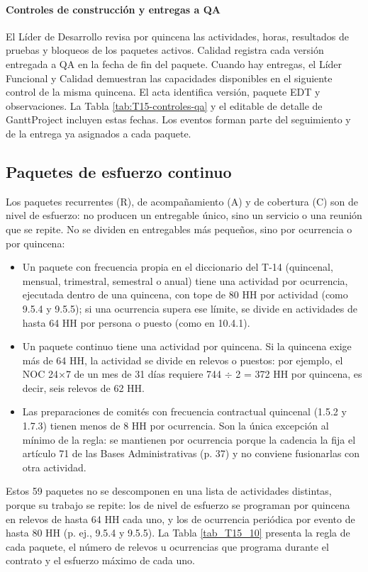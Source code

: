 \paragraph{Controles de construcción y entregas a QA}
El Líder de Desarrollo revisa por quincena las actividades, horas, resultados de pruebas y bloqueos de los paquetes activos. Calidad registra cada versión entregada a QA en la fecha de fin del paquete. Cuando hay entregas, el Líder Funcional y Calidad demuestran las capacidades disponibles en el siguiente control de la misma quincena. El acta identifica versión, paquete EDT y observaciones. La Tabla \ref{tab:T15-controles-qa} y el editable de detalle de GanttProject incluyen estas fechas. Los eventos forman parte del seguimiento y de la entrega ya asignados a cada paquete.


\subsection{Paquetes de esfuerzo continuo}

Los paquetes recurrentes (R), de acompañamiento (A) y de cobertura (C) son de nivel de esfuerzo: no producen un entregable único, sino un servicio o una reunión que se repite. No se dividen en entregables más pequeños, sino por ocurrencia o por quincena:

\begin{itemize}
\item Un paquete con frecuencia propia en el diccionario del T-14 (quincenal, mensual, trimestral, semestral o anual) tiene una actividad por ocurrencia, ejecutada dentro de una quincena, con tope de 80 HH por actividad (como 9.5.4 y 9.5.5); si una ocurrencia supera ese límite, se divide en actividades de hasta 64 HH por persona o puesto (como en 10.4.1).
\item Un paquete continuo tiene una actividad por quincena. Si la quincena exige más de 64 HH, la actividad se divide en relevos o puestos: por ejemplo, el NOC 24\ensuremath{\times}7 de un mes de 31 días requiere 744 \ensuremath{\div} 2 = 372 HH por quincena, es decir, seis relevos de 62 HH.
\item Las preparaciones de comités con frecuencia contractual quincenal (1.5.2 y 1.7.3) tienen menos de 8 HH por ocurrencia. Son la única excepción al mínimo de la regla: se mantienen por ocurrencia porque la cadencia la fija el artículo 71 de las Bases Administrativas (p. 37) y no conviene fusionarlas con otra actividad.

\end{itemize}
Estos 59 paquetes no se descomponen en una lista de actividades distintas, porque su trabajo se repite: los de nivel de esfuerzo se programan por quincena en relevos de hasta 64 HH cada uno, y los de ocurrencia periódica por evento de hasta 80 HH (p. ej., 9.5.4 y 9.5.5). La Tabla \ref{tab_T15_10} presenta la regla de cada paquete, el número de relevos u ocurrencias que programa durante el contrato y el esfuerzo máximo de cada uno.

